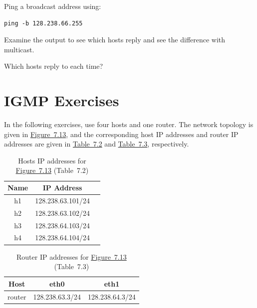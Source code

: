 \documentclass{../UTNetLab}
\begin{document}
Ping a broadcast address using:

\begin{lstlisting}
ping -b 128.238.66.255
\end{lstlisting}
Examine the  output to see which hosts reply and see the difference with multicast.

\begin{report}
    \item Which hosts reply to  each time?
\end{report}

\part{IGMP Exercises}\label{sec:igmp}
In the following exercises, use four hosts and one router.
The network topology is given in \hyperref[fig:7.13]{Figure~7.13}, and the corresponding host IP addresses and router IP addresses are given in \hyperref[tab:7.2]{Table~7.2} and \hyperref[tab:7.3]{Table~7.3}, respectively.

\begin{table}[H]
    \caption{Hosts IP addresses for \hyperref[fig:7.13]{Figure~7.13} (Table~7.2)}
    \label{tab:7.2}
    \centering
    \begin{tabular}{ *3c }
        \hline \hline
        Name & IP Address        \\
        \hline
        h1   & 128.238.63.101/24 \\
        h2   & 128.238.63.102/24 \\
        h3   & 128.238.64.103/24 \\
        h4   & 128.238.64.104/24 \\
        \hline \hline
    \end{tabular}
\end{table}

\begin{table}[H]
    \caption{Router IP addresses for \hyperref[fig:7.13]{Figure~7.13} (Table~7.3)}
    \label{tab:7.3}
    \centering
    \begin{tabular}{ *3c }
        \hline \hline
        Host   & eth0            & eth1            \\
        \hline
        router & 128.238.63.3/24 & 128.238.64.3/24 \\
        \hline \hline
    \end{tabular}
\end{table}
\end{document}
